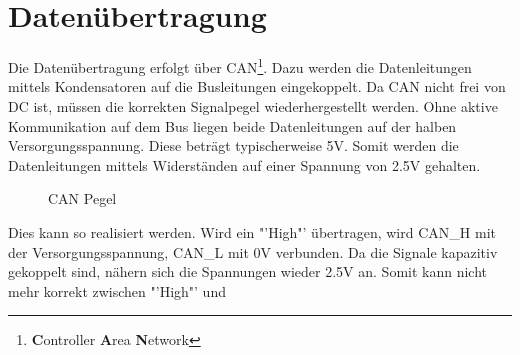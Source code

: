 \section{Datenübertragung}
Die Datenübertragung erfolgt über 
CAN\footnote{\textbf{C}ontroller \textbf{A}rea \textbf{N}etwork}. Dazu werden 
die Datenleitungen mittels Kondensatoren auf die Busleitungen eingekoppelt. Da 
CAN nicht frei von DC ist, müssen die korrekten Signalpegel wiederhergestellt 
werden. Ohne aktive Kommunikation auf dem Bus liegen beide Datenleitungen auf 
der halben Versorgungsspannung. Diese beträgt typischerweise 5\si{\volt}. 
Somit werden die Datenleitungen mittels Widerständen auf einer Spannung von 
2.5\si{\volt} gehalten. 
\begin{figure}[h!]
    \centering
    \caption{CAN Pegel}
    \label{fig:can_levels}
\end{figure}
Dies kann so realisiert werden. Wird ein "'High"' 
übertragen, wird CAN\_H mit der Versorgungsspannung, CAN\_L mit 0\si{\volt} 
verbunden. Da die Signale kapazitiv gekoppelt sind, nähern sich die Spannungen 
wieder 2.5\si{\volt} an. Somit kann nicht mehr korrekt zwischen "'High"' und 
